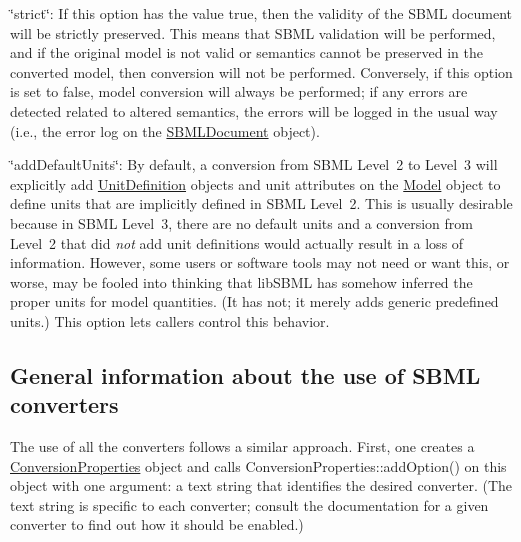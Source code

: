 \begin{DoxyItemize}
\item {\ttfamily \char`\"{}strict\char`\"{}}\+: If this option has the value {\ttfamily true}, then the validity of the S\+B\+ML document will be strictly preserved. This means that S\+B\+ML validation will be performed, and if the original model is not valid or semantics cannot be preserved in the converted model, then conversion will not be performed. Conversely, if this option is set to {\ttfamily false}, model conversion will always be performed; if any errors are detected related to altered semantics, the errors will be logged in the usual way (i.\+e., the error log on the \hyperlink{class_s_b_m_l_document}{S\+B\+M\+L\+Document} object).\end{DoxyItemize}
\begin{DoxyItemize}
\item {\ttfamily \char`\"{}add\+Default\+Units\char`\"{}}\+: By default, a conversion from S\+B\+ML Level~2 to Level~3 will explicitly add \hyperlink{class_unit_definition}{Unit\+Definition} objects and unit attributes on the \hyperlink{class_model}{Model} object to define units that are implicitly defined in S\+B\+ML Level~2. This is usually desirable because in S\+B\+ML Level~3, there are no default units and a conversion from Level~2 that did {\itshape not} add unit definitions would actually result in a loss of information. However, some users or software tools may not need or want this, or worse, may be fooled into thinking that lib\+S\+B\+ML has somehow inferred the proper units for model quantities. (It has not; it merely adds generic predefined units.) This option lets callers control this behavior.\end{DoxyItemize}
\hypertarget{classdoc__section__using__sbml__converters_using-converters}{}\subsection{General information about the use of S\+B\+M\+L converters}\label{classdoc__section__using__sbml__converters_using-converters}
The use of all the converters follows a similar approach. First, one creates a \hyperlink{class_conversion_properties}{Conversion\+Properties} object and calls Conversion\+Properties\+::add\+Option() on this object with one argument\+: a text string that identifies the desired converter. (The text string is specific to each converter; consult the documentation for a given converter to find out how it should be enabled.)

